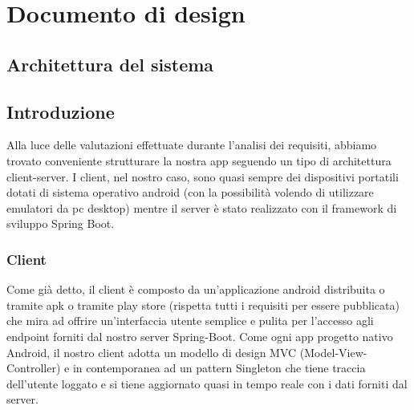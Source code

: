 \section{Documento di design}
    \subsection{Architettura del sistema}

    \subsection{Introduzione}
    \begin{flushleft}
        Alla luce delle valutazioni effettuate durante l'analisi dei requisiti, abbiamo trovato conveniente strutturare la nostra app seguendo un tipo di 
        architettura client-server. I client, nel nostro caso, sono quasi sempre dei dispositivi portatili dotati di sistema operativo android (con la possibilità volendo di utilizzare emulatori da pc desktop)
        mentre il server è stato realizzato con il framework di sviluppo Spring Boot.

    \end{flushleft}

    \subsubsection{Client}
    \begin{flushleft}
        Come già detto, il client è composto da un'applicazione android distribuita o tramite apk o tramite play store (rispetta tutti i requisiti per essere pubblicata) che mira ad offrire un'interfaccia utente semplice e pulita 
        per l'accesso agli endpoint forniti dal nostro server Spring-Boot. Come ogni app progetto nativo Android, il nostro client adotta un modello di design MVC (Model-View-Controller) e 
        in contemporanea ad un pattern Singleton che tiene traccia dell'utente loggato e si tiene aggiornato quasi in tempo reale con i dati forniti dal server.
    \end{flushleft}
    \vspace{0.2cm}



